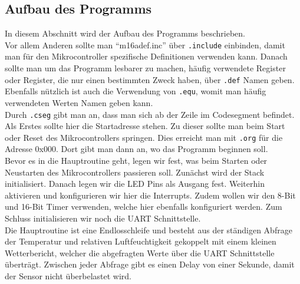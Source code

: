 \documentclass[]{article}
\begin{document}
\subsection{Aufbau des Programms}
In diesem Abschnitt wird der Aufbau des Programms beschrieben.
\\Vor allem Anderen sollte man "`m16adef.inc"' über \texttt{.include} einbinden, damit man für den Mikrocontroller spezifische Definitionen verwenden kann. Danach sollte man um das Programm lesbarer zu machen, häufig verwendete Register oder Register, die nur einen bestimmten Zweck haben, über \texttt{.def} Namen geben. Ebenfalls nützlich ist auch die Verwendung von \texttt{.equ}, womit man häufig verwendeten Werten Namen geben kann.
\\Durch \texttt{.cseg} gibt man an, dass man sich ab der Zeile im Codesegment befindet. Als Erstes sollte hier die Startadresse stehen. Zu dieser sollte man beim Start oder Reset des Mikrocontrollers springen. Dies erreicht man mit \texttt{.org} für die Adresse 0x000. Dort gibt man dann an, wo das Programm beginnen soll.
\\Bevor es in die Hauptroutine geht, legen wir fest, was beim Starten oder Neustarten des Mikrocontrollers passieren soll. Zunächst wird der Stack initialisiert. Danach legen wir die LED Pins als Ausgang fest. Weiterhin aktivieren und konfigurieren wir hier die Interrupts. Zudem wollen wir den 8-Bit und 16-Bit Timer verwenden, welche hier ebenfalls konfiguriert werden. Zum Schluss initialisieren wir noch die UART Schnittstelle.
\\Die Hauptroutine ist eine Endlosschleife und besteht aus der ständigen Abfrage der Temperatur und relativen Luftfeuchtigkeit gekoppelt mit einem kleinen Wetterbericht, welcher die abgefragten Werte über die UART Schnittstelle überträgt. Zwischen jeder Abfrage gibt es einen Delay von einer Sekunde, damit der Sensor nicht überbelastet wird.
\end{document}
